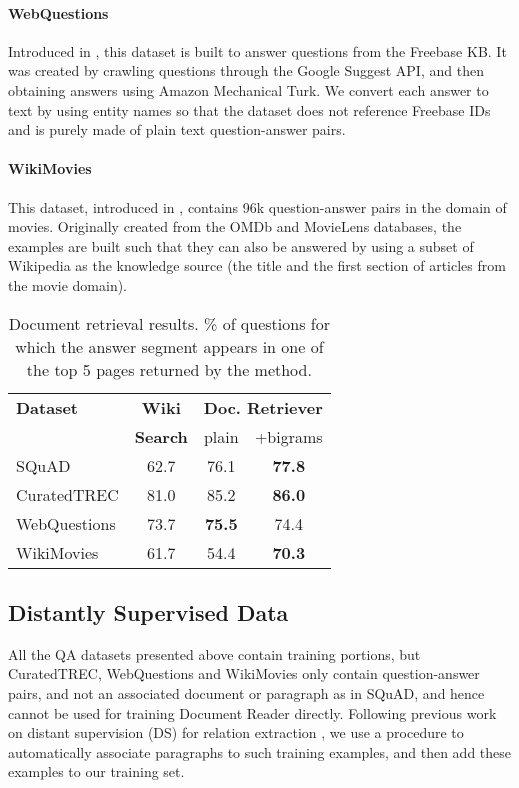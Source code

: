 \documentclass[11pt,a4paper]{article}
\newcommand\squad{SQuAD\xspace}
\newcommand\lcurq{CuratedTREC\xspace}
\newcommand\wikim{WikiMovies\xspace}
\newcommand\wq{WebQuestions\xspace}
\newcommand\usp{Document Reader\xspace}
\begin{document}
\paragraph{\wq} Introduced in \cite{berant2013semantic}, this dataset is built to answer questions from the Freebase KB. It was created by crawling questions through the Google Suggest API, and then obtaining answers using Amazon Mechanical Turk.
We convert each answer to text by using entity names so that the dataset does not reference Freebase IDs and is purely made of plain text question-answer pairs.

\paragraph{\wikim} This dataset, introduced in \cite{miller2016key}, contains 96k question-answer pairs in the domain of movies. Originally created from the OMDb and MovieLens databases, the examples are built such that they can also be answered by using a subset of Wikipedia as the knowledge source (the title and the first section of articles from the movie domain).

\begin{table}[t]
\begin{center}
\normalsize
\begin{tabular}{l|c|cc}
\hline
\bf Dataset &  \bf Wiki & \multicolumn{2}{c}{\bf Doc. Retriever} \\
&  \bf Search  & plain &  +bigrams  \\
\hline
\squad & 62.7 &  76.1 & \bf 77.8 \\
\lcurq & 81.0 & 85.2 & \bf 86.0 \\
\wq &    73.7 & \bf 75.5 & 74.4 \\
\wikim & 61.7 &  54.4 &  \bf 70.3 \\
\hline
\end{tabular}
\end{center}
\caption{\label{tab:ir-res} Document retrieval results. \% of questions for which the answer segment appears in one of the top 5 pages returned by the method. }
\end{table}


\subsection{Distantly Supervised Data} \label{sec:ds}

All the QA datasets presented above contain training portions, but CuratedTREC, WebQuestions
and WikiMovies only contain question-answer pairs, and not
an associated document or paragraph as in SQuAD, and hence
cannot be used for training \usp directly.
Following previous work on distant supervision (DS) for relation extraction \cite{mintz2009distant}, we use a procedure to automatically associate paragraphs to such training examples, and then add these examples to our
training set.
\end{document}
